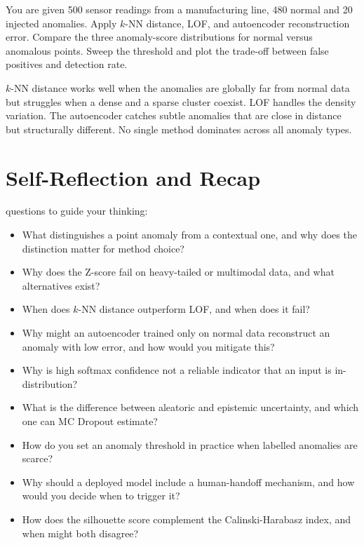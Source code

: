 \vspace{2.5em}



You are given 500 sensor readings from a manufacturing line, 480 normal and 20 injected anomalies.
Apply $k$-NN distance, LOF, and autoencoder reconstruction error.
Compare the three anomaly-score distributions for normal versus anomalous points.
Sweep the threshold and plot the trade-off between false positives and detection rate.

$k$-NN distance works well when the anomalies are globally far from normal data but struggles when a dense and a sparse cluster coexist.
LOF handles the density variation.
The autoencoder catches subtle anomalies that are close in distance but structurally different.
No single method dominates across all anomaly types.


\section{Self-Reflection and Recap}

 questions to guide your thinking:
\begin{itemize}
    \item What distinguishes a point anomaly from a contextual one, and why does the distinction matter for method choice?
    \item Why does the Z-score fail on heavy-tailed or multimodal data, and what alternatives exist?
    \item When does $k$-NN distance outperform LOF, and when does it fail?
    \item Why might an autoencoder trained only on normal data reconstruct an anomaly with low error, and how would you mitigate this?
    \item Why is high softmax confidence not a reliable indicator that an input is in-distribution?
    \item What is the difference between aleatoric and epistemic uncertainty, and which one can MC Dropout estimate?
    \item How do you set an anomaly threshold in practice when labelled anomalies are scarce?
    \item Why should a deployed model include a human-handoff mechanism, and how would you decide when to trigger it?
    \item How does the silhouette score complement the Calinski-Harabasz index, and when might both disagree?
\end{itemize}

